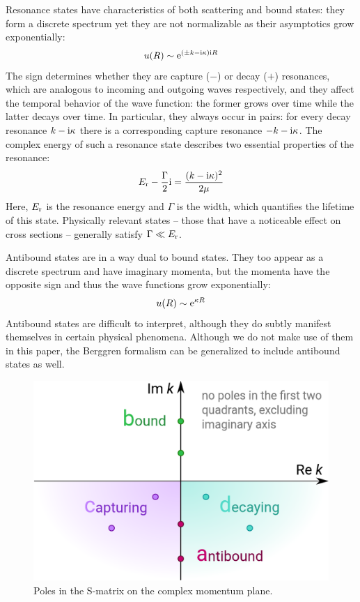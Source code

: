 \documentclass[amsmath, amssymb, aps, floatfix, nofootinbib, preprintnumbers,
  showpacs, superscriptaddress, twocolumn]{revtex4-1}
\begin{document}
Resonance states have characteristics of both scattering and bound states:
they form a discrete spectrum yet they are not normalizable as their
asymptotics grow exponentially:
\begin{align*}
  u(R) \sim \mathrm e^{(\pm k - \mathrm{i} \kappa) \mathrm{i} R}
\end{align*}
The sign determines whether they are capture ($-$) or decay ($+$) resonances,
which are analogous to incoming and outgoing waves respectively, and they
affect the temporal behavior of the wave function: the former grows over time
while the latter decays over time.  In particular, they always occur in pairs:
for every decay resonance $k - \mathrm{i} \kappa$ there is a corresponding capture
resonance $-k - \mathrm{i} \kappa$.  The complex energy of such a resonance state
describes two essential properties of the resonance:
\begin{align*}
  E_{\text r} - \frac{\Gamma}{2} \mathrm{i} = \frac{(k - \mathrm{i} \kappa)^2}{2 \mu}
\end{align*}
Here, $E_{\text r}$ is the resonance energy and $\Gamma$ is the width, which
quantifies the lifetime of this state.  Physically relevant states -- those
that have a noticeable effect on cross sections -- generally satisfy
$\Gamma \ll E_{\text r}$.

Antibound states are in a way dual to bound states.  They too appear as a
discrete spectrum and have imaginary momenta, but the momenta have the
opposite sign and thus the wave functions grow exponentially:
\begin{align*}
  u(R) \sim \mathrm e^{\kappa R}
\end{align*}
Antibound states are difficult to interpret\cite{Michel2009}, although they do
subtly manifest themselves in certain physical phenomena.  Although we do not
make use of them in this paper, the Berggren formalism can be generalized to
include antibound states as well.\cite{Vertse1989}

\begin{figure}
  \includegraphics[width=.4\textwidth]{proj-poles.pdf}
  \caption{Poles in the S-matrix on the complex momentum plane.}
  \label{fig:1}
\end{figure}
\end{document}
